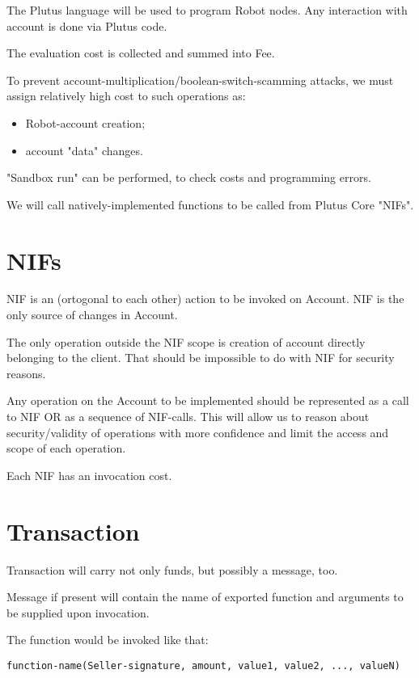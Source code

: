 \documentclass[a4paper]{article}
\begin{document}
The Plutus language \cite{plutus} will be used to program Robot nodes.
Any interaction with account is done via Plutus code.

The evaluation cost is collected and summed into Fee.

To prevent account-multiplication/boolean-switch-scamming attacks, we must assign relatively high cost to such operations as:
\begin{itemize}
  \item Robot-account creation;
  \item account "data" changes.
\end{itemize}

"Sandbox run" can be performed, to check costs and programming errors.

We will call natively-implemented functions to be called from Plutus Core "NIFs".

\section*{NIFs}

NIF is an (ortogonal to each other) action to be invoked on Account.
NIF is the only source of changes in Account.

The only operation outside the NIF scope is creation of account directly belonging to the client.
That should be impossible to do with NIF for security reasons.

Any operation on the Account to be implemented should be represented as a call to NIF OR as a sequence of NIF-calls.
This will allow us to reason about security/validity of operations with more confidence and limit the access and scope of each operation.

Each NIF has an invocation cost.

\section*{Transaction}

Transaction will carry not only funds, but possibly a message, too.

Message if present will contain the name of exported function and arguments to be supplied upon invocation.

The function would be invoked like that:

\begin{verbatim}
function-name(Seller-signature, amount, value1, value2, ..., valueN)
\end{verbatim}
\end{document}
